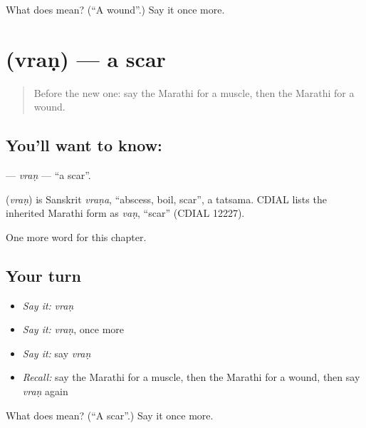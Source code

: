 \begin{tcolorbox}[breakable,colback=teal!4,colframe=teal!35!black,title={Before you move on}]
What does  mean? (\textquotedblleft{}A wound\textquotedblright{}.) Say it once more.
\end{tcolorbox}
\section[\texorpdfstring{\mr{व्रण} (vraṇ)}{व्रण (vraṇ)}]{ (vraṇ) — a scar}

\label{lesson:MR-C200-vran}



\begin{quote}
Before the new one: say the Marathi for a muscle, then the Marathi for a wound.
\end{quote}

\subsection*{You'll want to know: }
\textbf{} — \emph{vraṇ} — \textquotedblleft{}a scar\textquotedblright{}.

\begin{cousinweb}
\textbf{} (\emph{vraṇ}) is Sanskrit \emph{vraṇa}, \textquotedblleft{}abscess, boil, scar\textquotedblright{}, a tatsama. CDIAL lists the inherited Marathi form as \emph{vaṇ}, \textquotedblleft{}scar\textquotedblright{} (CDIAL 12227).
\end{cousinweb}

\begin{grammarlens}[title={What you've built}]
One more word for this chapter.
\end{grammarlens}

\subsection*{Your turn}
\begin{itemize}
\raggedright
  \item \emph{Say it:} \emph{vraṇ}
  \item \emph{Say it:} \emph{vraṇ}, once more
  \item \emph{Say it:} say \emph{vraṇ}
  \item \emph{Recall:} say the Marathi for a muscle, then the Marathi for a wound, then say \emph{vraṇ} again
\end{itemize}

\begin{tcolorbox}[breakable,colback=teal!4,colframe=teal!35!black,title={Before you move on}]
What does  mean? (\textquotedblleft{}A scar\textquotedblright{}.) Say it once more.
\end{tcolorbox}
